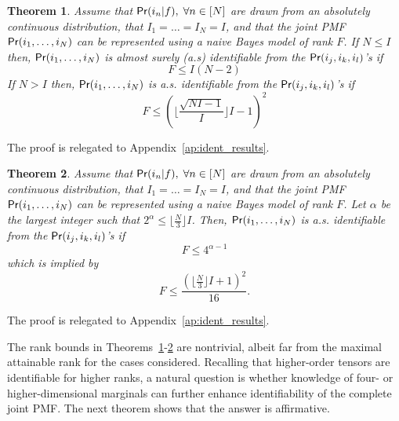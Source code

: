 \documentclass[journal]{IEEEtran}
\newtheorem{Theorem}{Theorem}
\begin{document}
{
\begin{Theorem}\label{thm:proposed_1}
	Assume that ${\sf Pr}( i_n| f), \; \forall n\in [N]$ are drawn from an absolutely continuous distribution, that $I_1=\ldots=I_N=I$, and that the joint PMF ${\sf Pr}(i_1,\ldots,i_N)$ can be represented using a naive Bayes model of rank $F$. If $N \leq I$ then, ${\sf Pr}(i_1,\ldots,i_N)$ is almost surely (a.s) identifiable from the ${\sf Pr}(i_j,i_k,i_l)$'s if
		\[F \leq I(N-2) \]
If $N>I$ then, ${\sf Pr}(i_1,\ldots,i_N)$ is  a.s. identifiable from the ${\sf Pr}(i_j,i_k,i_l)$'s if
\[F \leq \left( \lfloor \frac{\sqrt{NI-1}}{I}\rfloor I -1 \right )^2 \]
\end{Theorem}
\begin{IEEEproof}
	The proof is relegated to Appendix~\ref{ap:ident_results}.
\end{IEEEproof}
}

{
\begin{Theorem}\label{thm:proposed_2}
	Assume that ${\sf Pr}(i_n| f), \; \forall n\in [N]$ are drawn from an absolutely continuous distribution, that $I_1=\ldots=I_N=I$, and that the joint PMF ${\sf Pr}(i_1,\ldots,i_N)$ can be represented using a naive Bayes model of rank $F$.  {Let $\alpha$ be the largest integer such that $2^\alpha\leq \lfloor{\frac{N}{3}}\rfloor I$. Then, ${\sf Pr}(i_1,\ldots,i_N)$ is a.s. identifiable from the ${\sf Pr}(i_j,i_k,i_l)$'s if
	\[F\leq  4^{\alpha -1} \] which is implied by
	\[F\leq  \frac{(\lfloor{\frac{N}{3}}\rfloor I+1)^2}{16}.  \]
}\end{Theorem}

\begin{IEEEproof}
	The proof is relegated to Appendix~\ref{ap:ident_results}.
\end{IEEEproof}
}
The rank bounds in Theorems~\ref{thm:proposed_1}-\ref{thm:proposed_2} are nontrivial, albeit far from the maximal attainable rank for the cases considered.  Recalling that higher-order tensors  are identifiable for higher ranks, a natural question is whether knowledge of  {four- or higher-dimensional} marginals can further enhance identifiability of the complete joint PMF.  The next theorem shows that the answer is affirmative.
\end{document}

